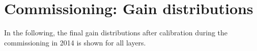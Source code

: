 \chapter{Commissioning: Gain distributions}
\label{appendix:GainDistribuCommi}

In the following, the final gain distributions after calibration during the commissioning in 2014 is shown for all layers.
